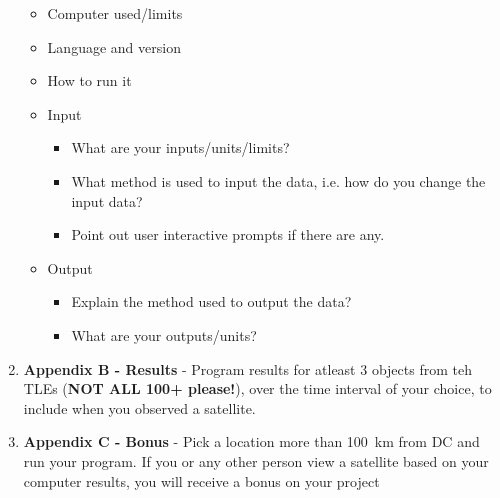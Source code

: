 \documentclass[11pt, reqno]{article}    %
\begin{document}
\begin{enumerate}
\begin{itemize}
            \item Computer used/limits
            \item Language and version
            \item How to run it
            \item Input
                \begin{itemize}
                    \item What are your inputs/units/limits?
                    \item What method is used to input the data, i.e. how do you change the input data?
                    \item Point out user interactive prompts if there are any.
                \end{itemize}
            \item Output
                \begin{itemize}
                    \item Explain the method used to output the data?
                    \item What are your outputs/units?
                \end{itemize}
        \end{itemize}
    \item \textbf{Appendix B - Results} - Program results for atleast 3 objects from teh TLEs (\textbf{NOT ALL 100+ please!}), over the time interval of your choice, to include when you observed a satellite.
    \item \textbf{Appendix C - Bonus} - Pick a location more than \SI{100}{\kilo\meter} from DC and run your program. 
        If you or any other person view a satellite based on your computer results, you will receive a bonus on your project
\end{enumerate}
\end{document}
